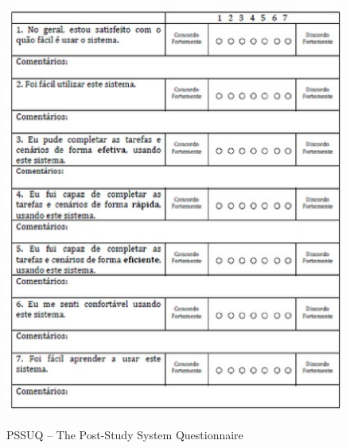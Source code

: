
\begin{figure}[!h]
    \centering
    \includegraphics[keepaspectratio=true,scale=0.60]
      {figuras/pssuq01.eps}
    \label{pssuq}
	\caption{PSSUQ – The Post-Study System Questionnaire}
\end{figure}

\newpage

